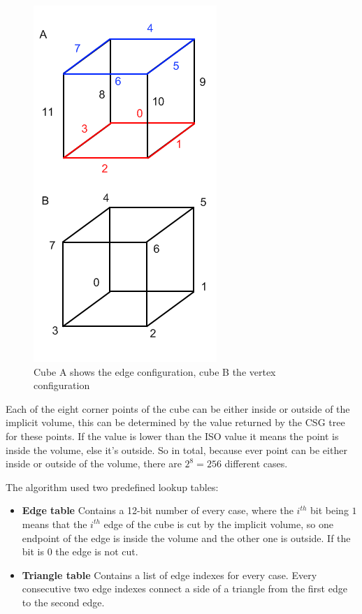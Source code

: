 \documentclass[a4paper,10pt,twocolumn]{article}
\begin{document}
    \begin{figure}[h]
        \begin{center}
            \includegraphics[scale=0.6]{./images/cube_config}
        \end{center}
        \caption{Cube A shows the edge configuration, cube B the vertex configuration}
        \label{figure:cube_config}
    \end{figure}

Each of the eight corner points of the cube can be either inside or outside of the implicit volume, this can be determined by the value returned by the CSG tree for these points. If the value is lower than the ISO value it means the point is inside the volume, else it's outside. So in total, because ever point can be either inside or outside of the volume, there are $2^8 = 256$ different cases.

The algorithm used two predefined lookup tables:

\begin{itemize}
    \item[] \textbf{Edge table} Contains a 12-bit number of every case, where the $i^{th}$ bit being $1$ means that the $i^{th}$ edge of the cube is cut by the implicit volume, so one endpoint of the edge is inside the volume and the other one is outside. If the bit is $0$ the edge is not cut.
    \item[] \textbf{Triangle table} Contains a list of edge indexes for every case. Every consecutive two edge indexes connect a side of a triangle from the first edge to the second edge.
\end{itemize}
\end{document}
